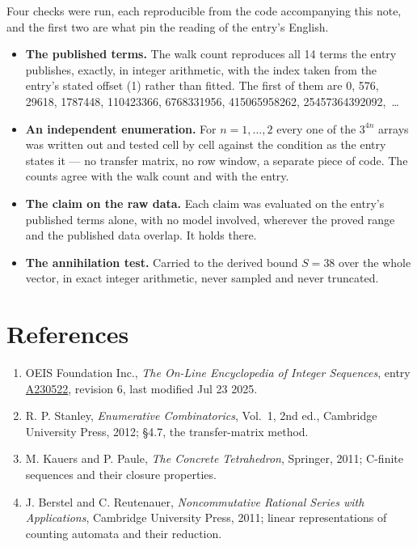 \documentclass[11pt]{article}
\theoremstyle{definition}
\begin{document}
Four checks were run, each reproducible from the code accompanying this note, and the first two are what pin the reading of the entry's English.

\begin{itemize}

\item {\bfseries The published terms.} The walk count reproduces all 14 terms the entry publishes, exactly, in integer arithmetic, with the index taken from the entry's stated offset (1) rather than fitted. The first of them are 0, 576, 29618, 1787448, 110423366, 6768331956, 415065958262, 25457364392092,~\dots

\item {\bfseries An independent enumeration.} For $n = 1,\dots,2$ every one of the $3^{4n}$ arrays was written out and tested cell by cell against the condition as the entry states it --- no transfer matrix, no row window, a separate piece of code. The counts agree with the walk count and with the entry.

\item {\bfseries The claim on the raw data.} Each claim was evaluated on the entry's published terms alone, with no model involved, wherever the proved range and the published data overlap. It holds there.

\item {\bfseries The annihilation test.} Carried to the derived bound $S = 38$ over the whole vector, in exact integer arithmetic, never sampled and never truncated.

\end{itemize}

\section{References}

\begin{enumerate}

\item OEIS Foundation Inc., \emph{The On-Line Encyclopedia of Integer Sequences}, entry \href{https://oeis.org/A230522}{A230522}, revision 6, last modified Jul 23 2025.

\item R. P. Stanley, \emph{Enumerative Combinatorics}, Vol.~1, 2nd ed., Cambridge University Press, 2012; \S4.7, the transfer-matrix method.

\item M. Kauers and P. Paule, \emph{The Concrete Tetrahedron}, Springer, 2011; C-finite sequences and their closure properties.

\item J. Berstel and C. Reutenauer, \emph{Noncommutative Rational Series with Applications}, Cambridge University Press, 2011; linear representations of counting automata and their reduction.

\end{enumerate}
\end{document}
